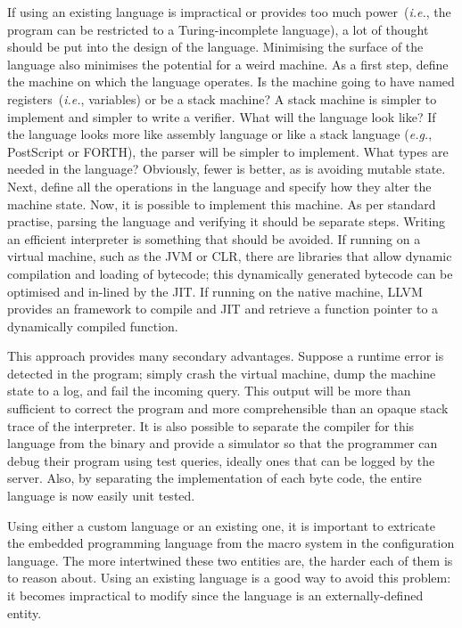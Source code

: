 \documentclass[letterpaper,twocolumn,10pt]{article}
\begin{document}
If using an existing language is impractical or provides too much power~(\emph{i.e.}, the program can be restricted to a Turing-incomplete language), a lot of thought should be put into the design of the language. Minimising the surface of the language also minimises the potential for a weird machine. As a first step, define the machine on which the language operates. Is the machine going to have named registers~(\emph{i.e.}, variables) or be a stack machine? A stack machine is simpler to implement and simpler to write a verifier. What will the language look like? If the language looks more like assembly language or like a stack language (\emph{e.g.}, PostScript or FORTH), the parser will be simpler to implement. What types are needed in the language? Obviously, fewer is better, as is avoiding mutable state. Next, define all the operations in the language and specify how they alter the machine state. Now, it is possible to implement this machine. As per standard practise, parsing the language and verifying it should be separate steps. Writing an efficient interpreter is something that should be avoided. If running on a virtual machine, such as the JVM or CLR, there are libraries that allow dynamic compilation and loading of bytecode; this dynamically generated bytecode can be optimised and in-lined by the JIT. If running on the native machine, LLVM provides an framework to compile and JIT and retrieve a function pointer to a dynamically compiled function.

This approach provides many secondary advantages. Suppose a runtime error is detected in the program; simply crash the virtual machine, dump the machine state to a log, and fail the incoming query. This output will be more than sufficient to correct the program and more comprehensible than an opaque stack trace of the interpreter. It is also possible to separate the compiler for this language from the binary and provide a simulator so that the programmer can debug their program using test queries, ideally ones that can be logged by the server. Also, by separating the implementation of each byte code, the entire language is now easily unit tested.

Using either a custom language or an existing one, it is important to extricate the embedded programming language from the macro system in the configuration language. The more intertwined these two entities are, the harder each of them is to reason about. Using an existing language is a good way to avoid this problem: it becomes impractical to modify since the language is an externally-defined entity.
\end{document}
